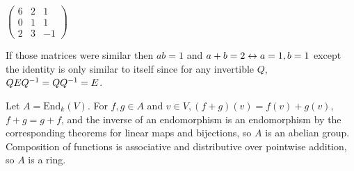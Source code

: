 \documentclass[11pt, oneside]{article}   	%
\begin{document}
\item $\left( \begin{array}{ccc}  6 & 2 & 1 \\ 0 & 1 & 1 \\ 2 & 3 & -1 \end{array} \right)$
\item If those matrices were similar then $ab = 1$ and $a + b = 2 \leftrightarrow a = 1, b = 1$ except the identity is only similar to itself since for any invertible $Q$, $QEQ^{-1} = QQ^{-1} = E$.
\item Let $A = \text{End}_k(V)$. For $f, g \in A$ and $v\in V, (f + g)(v) = f(v) + g(v)$, $f + g = g + f$, and the inverse of an endomorphism is an endomorphism by the corresponding theorems for linear maps and bijections, so $A$ is an abelian group. Composition of functions is associative and distributive over pointwise addition, so $A$ is a ring.
\ee
\end{document}

